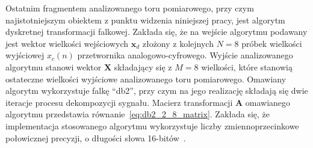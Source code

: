 Ostatnim fragmentem analizowanego toru pomiarowego, przy czym najistotniejszym obiektem z punktu widzenia niniejszej pracy, jest algorytm dyskretnej transformacji falkowej. Zakłada się, że na wejście algorytmu podawany jest wektor wielkości wejściowych $\mathbf{x}_{d}$ złożony z kolejnych $N = 8$ próbek wielkości wyjściowej $x_{c}(n)$ przetwornika analogowo-cyfrowego. Wyjście analizowanego algorytmu stanowi wektor $\mathbf{X}$ składający się z $M = 8$ wielkości, które stanowią ostateczne wielkości wyjściowe analizowanego toru pomiarowego. Omawiany algorytm wykorzystuje falkę \enquote{db2}, przy czym na jego realizację składają się dwie iteracje procesu dekompozycji sygnału. Macierz transformacji $\mathbf{A}$ omawianego algorytmu przedstawia równanie~\eqref{eq:db2_2_8_matrix}. Zakłada się, że implementacja stosowanego algorytmu wykorzystuje liczby zmiennoprzecinkowe połowicznej precyzji, o długości słowa 16-bitów~\cite{gcc_manual}.

